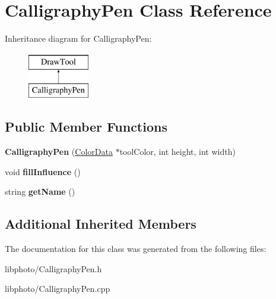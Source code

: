 \hypertarget{classCalligraphyPen}{\section{Calligraphy\-Pen Class Reference}
\label{classCalligraphyPen}
}
Inheritance diagram for Calligraphy\-Pen\-:\begin{figure}[H]
\begin{center}
\leavevmode
\includegraphics[height=2.000000cm]{classCalligraphyPen}
\end{center}
\end{figure}
\subsection*{Public Member Functions}
\begin{DoxyCompactItemize}
\item 
\hypertarget{classCalligraphyPen_a0a7aee1d27a037b4d863df7433530e54}{{\bfseries Calligraphy\-Pen} (\hyperlink{classColorData}{Color\-Data} $\ast$tool\-Color, int height, int width)}\label{classCalligraphyPen_a0a7aee1d27a037b4d863df7433530e54}

\item 
\hypertarget{classCalligraphyPen_add13526712abc99aad6cac69274d35ef}{void {\bfseries fill\-Influence} ()}\label{classCalligraphyPen_add13526712abc99aad6cac69274d35ef}

\item 
\hypertarget{classCalligraphyPen_a081fa10395524ad361a500ee58ecd0e8}{string {\bfseries get\-Name} ()}\label{classCalligraphyPen_a081fa10395524ad361a500ee58ecd0e8}

\end{DoxyCompactItemize}
\subsection*{Additional Inherited Members}


The documentation for this class was generated from the following files\-:\begin{DoxyCompactItemize}
\item 
libphoto/Calligraphy\-Pen.\-h\item 
libphoto/Calligraphy\-Pen.\-cpp\end{DoxyCompactItemize}
